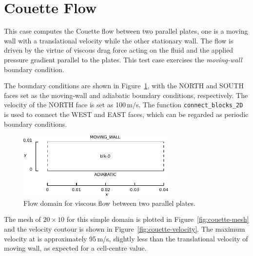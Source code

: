 
\newpage
\section{Couette Flow}
\label{couette-flow-2D}
%
This case computes the Couette flow between two parallel plates,
one is a moving wall with a translational velocity while the other stationary wall.
The flow is driven by the virtue of viscous drag force acting on the fluid and the applied
pressure gradient parallel to the plates.
This test case exercises the \emph{moving-wall} boundary condition.

\medskip
The boundary conditions are shown in Figure~\ref{couette-layout-fig}, 
with the NORTH and SOUTH faces set as the moving-wall and adiabatic boundary conditions, respectively.
The velocity of the NORTH face is set as 100\,m/s.
The function \verb!connect_blocks_2D! is used to connect the WEST and EAST faces, 
which can be regarded as periodic boundary conditions.

\begin{figure}[htbp]
\begin{center}
\includegraphics[width=0.7\textwidth]{../2D/couette-flow/couette.pdf}
\end{center}
\caption{Flow domain for viscous flow between two parallel plates.}
   \label{couette-layout-fig}
\end{figure}

\medskip
The mesh of $20 \times 10$ for this simple domain is plotted in Figure~\ref{fig:couette-mesh} 
and the velocity coutour is shown in Figure~\ref{fig:couette-velocity}.
The maximum velocity at is approximately 95\,m/s, 
slightly less than the translational velocity of moving wall, 
as expected for a cell-centre value.

